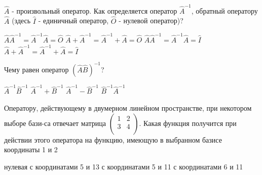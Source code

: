 \documentclass[11pt,a4paper]{exam}
\begin{document}
\begin{questions}
\question $\hat{A}$ - произвольный оператор. Как определяется оператор ${{\hat{A}}^{-1}}$, обратный оператору $\hat{A}$ (здесь $\hat{I}$ - единичный оператор, $\hat{O}$ - нулевой оператор)?
\begin{choices}
\choice $\hat{A}{{\hat{A}}^{-1}}={{\hat{A}}^{-1}}\hat{A}=\hat{O}$       
\choice $\hat{A}+{{\hat{A}}^{-1}}={{\hat{A}}^{-1}}+\hat{A}=\hat{O}$
\choice $\hat{A}{{\hat{A}}^{-1}}={{\hat{A}}^{-1}}\hat{A}=\hat{I}$       
\choice $\hat{A}+{{\hat{A}}^{-1}}={{\hat{A}}^{-1}}+\hat{A}=\hat{I}$
\end{choices}

\question Чему равен оператор ${{\left( \hat{A}\hat{B} \right)}^{-1}}$?
\begin{choices}
\choice ${{\hat{A}}^{-1}}{{\hat{B}}^{-1}}$      
\choice ${{\hat{A}}^{-1}}+{{\hat{B}}^{-1}}$     
\choice ${{\hat{A}}^{-1}}-{{\hat{B}}^{-1}}$     
\choice ${{\hat{B}}^{-1}}{{\hat{A}}^{-1}}$
\end{choices}

\question Оператору, действующему в двумерном линейном пространстве, при некотором выборе бази-са отвечает матрица $\left( \begin{matrix}
   1 & 2  \\
   3 & 4  \\
\end{matrix} \right)$. Какая функция получится при действии этого оператора на функцию, имеющую в выбранном базисе координаты 1 и 2
\begin{choices}
\choice нулевая         
\choice с координатами 5 и 13 
\choice с координатами 5 и 11      
\choice с координатами 6 и 11
\end{choices}


\end{questions}
\end{document}
